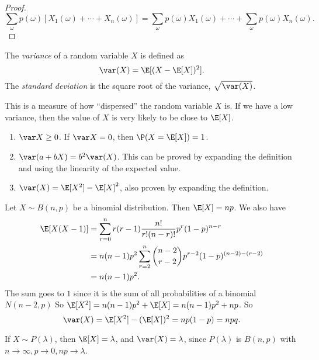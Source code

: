 \documentclass[a4paper]{article}
\begin{document}
\begin{proof}
  \[
    \sum_\omega p(\omega)[X_1(\omega) + \cdots + X_n(\omega)] = \sum_\omega p(\omega)X_1(\omega) + \cdots + \sum_\omega p(\omega) X_n(\omega).
  \]
\end{proof}

\begin{defi}
  The \emph{variance} of a random variable $X$ is defined as
  \[
    \var(X) = \E[(X - \E[X])^2].
  \]
  The \emph{standard deviation} is the square root of the variance, $\sqrt{\var(X)}$.
\end{defi}
This is a measure of how ``dispersed'' the random variable $X$ is. If we have a low variance, then the value of $X$ is very likely to be close to $\E[X]$.

\begin{thm}\leavevmode
  \begin{enumerate}
    \item $\var X \geq 0$. If $\var X = 0$, then $\P(X = \E[X]) = 1$.
    \item $\var (a + bX) = b^2 \var(X)$. This can be proved by expanding the definition and using the linearity of the expected value.
    \item $\var(X) = \E[X^2] - \E[X]^2$, also proven by expanding the definition.
  \end{enumerate}
\end{thm}

\begin{eg}
  Let $X\sim B(n, p)$ be a binomial distribution. Then $\E[X] = np$. We also have
  \begin{align*}
    \E[X(X - 1)] &= \sum_{r = 0}^n r(r - 1)\frac{n!}{r!(n - r)!} p^r(1 - p)^{n - r}\\
    &= n(n - 1)p^2\sum_{r = 2}^n \binom{n - 2}{r - 2} p^{r - 2}(1 - p)^{(n - 2) - (r - 2)}\\
    &= n(n - 1)p^2.
  \end{align*}
  The sum goes to $1$ since it is the sum of all probabilities of a binomial $N(n - 2, p)$
  So $\E[X^2] = n(n - 1)p^2 + \E[X] = n(n - 1)p^2 + np$. So
  \[
    \var(X) = \E[X^2] - (\E[X])^2 = np(1 - p) = npq.
  \]
\end{eg}

\begin{eg}
  If $X\sim P(\lambda)$, then $\E[X] = \lambda$, and $\var(X) = \lambda$, since $P(\lambda)$ is $B(n, p)$ with $n\to \infty, p \to 0, np \to \lambda$.
\end{eg}
\end{document}
